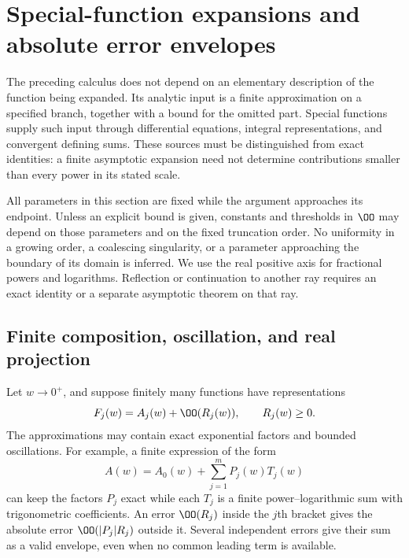 \section{Special-function expansions and absolute error envelopes}
\label{sec:special-function-expansions}

The preceding calculus does not depend on an elementary description of
the function being expanded. Its analytic input is a finite approximation
on a specified branch, together with a bound for the omitted part.
Special functions supply such input through differential equations,
integral representations, and convergent defining sums. These sources
must be distinguished from exact identities: a finite asymptotic
expansion need not determine contributions smaller than every power in
its stated scale.

All parameters in this section are fixed while the argument approaches
its endpoint. Unless an explicit bound is given, constants and
thresholds in $\OO$ may depend on those parameters and on the fixed
truncation order. No uniformity in a growing order, a coalescing
singularity, or a parameter approaching the boundary of its domain is
inferred. We use the real positive axis for fractional powers and
logarithms. Reflection or continuation to another ray requires an exact
identity or a separate asymptotic theorem on that ray.

\subsection{Finite composition, oscillation, and real projection}

Let $w\to0^+$, and suppose finitely many functions have representations
\begin{equation}
 F_j(w)=A_j(w)+\OO(R_j(w)),\qquad R_j(w)\ge0.
 \label{eq:special-function-input-envelope}
\end{equation}
The approximations may contain exact exponential factors and bounded
oscillations. For example, a finite expression of the form
\begin{equation}
 A(w)=A_0(w)+\sum_{j=1}^m P_j(w)T_j(w)
 \label{eq:special-function-finite-carriers}
\end{equation}
can keep the factors $P_j$ exact while each $T_j$ is a finite
power--logarithmic sum with trigonometric coefficients. An error
$\OO(R_j)$ inside the $j$th bracket gives the absolute error
$\OO(|P_j|R_j)$ outside it. Several independent errors give their sum
as a valid envelope, even when no common leading term is available.

